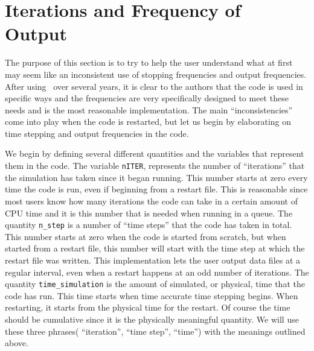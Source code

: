 \section{Iterations and Frequency of Output \label{section:frequency}}

The purpose of this section is to try to help the user understand what at
first may seem like an inconsistent use of stopping frequencies and output
frequencies.  After using \BATSRUS\ over several years, it is clear to the
authors that the code is used in specific ways and the frequencies are
very specifically designed to meet these needs and is the 
most reasonable implementation. The main ``inconsistencies''
come into play when the code is restarted, but let us begin by 
elaborating on time stepping and output frequencies in the code.

We begin by defining several different quantities and the variables that 
represent them in the code.  The variable {\tt nITER}, represents the number
of ``iterations'' that the simulation has taken since it began running.  This number
starts at zero every time the code is run, even if beginning from a restart file.
This is reasonable since most users know how many iterations the code can take
in a certain amount of CPU time and it is this number that is needed when running
in a queue.
The quantity {\tt n\_step} is a number of ``time steps'' that the code has 
taken in total.  This number starts at zero
when the code is started from scratch, but when started from a restart file, this
number will start with the time step at which the restart file was written.
This implementation lets the user output data files at a regular interval, even
when a restart happens at an odd number of iterations.
The quantity {\tt time\_simulation} is the amount of simulated, or physical, time
that the code has run.  This time starts when time accurate time stepping begins.
When restarting, it starts from the physical time for the restart.
Of course the time should be cumulative since it is the physically meaningful
quantity.  We will 
use these three phrases( ``iteration'', ``time step'', ``time'') with the meanings
outlined above.

